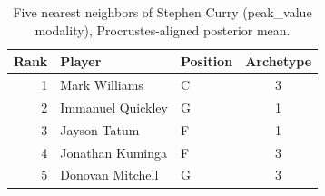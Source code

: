 \begin{table}[htbp]
  \centering\small
  \begin{tabular}{rllc}
    \toprule
    Rank & Player & Position & Archetype \\
    \midrule
    1 & Mark Williams & C & 3 \\
    2 & Immanuel Quickley & G & 1 \\
    3 & Jayson Tatum & F & 1 \\
    4 & Jonathan Kuminga & F & 3 \\
    5 & Donovan Mitchell & G & 3 \\
    \bottomrule
  \end{tabular}
  \caption{Five nearest neighbors of Stephen Curry (peak_value modality), Procrustes-aligned posterior mean.}
  \label{tab:Stephen_Curry_neighbors_peak_value}
\end{table}

